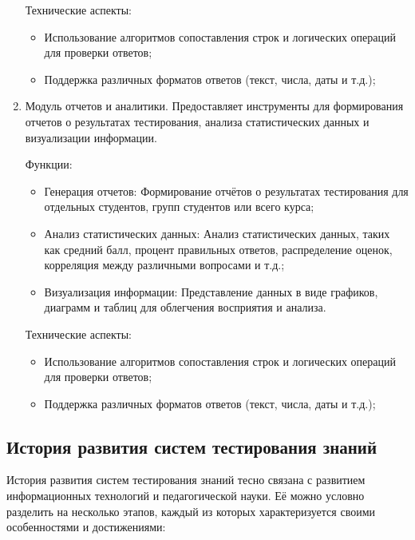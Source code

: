 \begin{enumerate}
	Технические аспекты:
	
	\begin{itemize}
		\item Использование алгоритмов сопоставления строк и логических операций для проверки ответов;
		\item Поддержка различных форматов ответов (текст, числа, даты и т.д.);
	\end{itemize}
	
	\item Модуль отчетов и аналитики. Предоставляет инструменты для формирования отчетов о результатах тестирования, анализа статистических данных и визуализации информации.
	
	Функции:
	
	\begin{itemize}
		\item Генерация отчетов: Формирование отчётов о результатах тестирования для отдельных студентов, групп студентов или всего курса;
		\item Анализ статистических данных: Анализ статистических данных, таких как средний балл, процент правильных ответов, распределение оценок, корреляция между различными вопросами и т.д.;
		\item Визуализация информации: Представление данных в виде графиков, диаграмм и таблиц для облегчения восприятия и анализа.
	\end{itemize}
	
	Технические аспекты:
	
	\begin{itemize}
		\item Использование алгоритмов сопоставления строк и логических операций для проверки ответов;
		\item Поддержка различных форматов ответов (текст, числа, даты и т.д.);
	\end{itemize}
	
\end{enumerate}

\subsection{История развития систем тестирования знаний}

История развития систем тестирования знаний тесно связана с развитием информационных технологий и педагогической науки. Её можно условно разделить на несколько этапов, каждый из которых характеризуется своими особенностями и достижениями:

